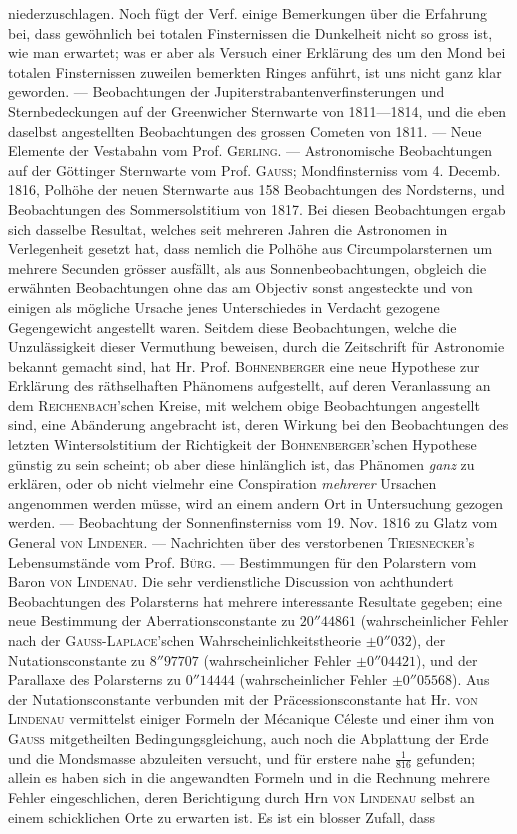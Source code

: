 niederzuschlagen. Noch fügt der Verf. einige Bemerkungen über die Erfahrung bei, dass gewöhnlich bei totalen Finsternissen die Dunkelheit nicht so gross ist, wie man erwartet; was er aber als Versuch einer Erklärung des um den Mond bei totalen Finsternissen zuweilen bemerkten Ringes anführt, ist uns nicht ganz klar geworden. --- Beobachtungen der Jupiterstrabantenverfinsterungen und Sternbedeckungen auf der Greenwicher Sternwarte von 1811---1814, und die eben daselbst angestellten Beobachtungen des grossen Cometen von 1811. --- Neue Elemente der Vestabahn vom Prof. \textsc{Gerling}. --- Astronomische Beobachtungen auf der Göttinger Sternwarte vom Prof. \textsc{Gauss}; Mondfinsterniss vom 4. Decemb. 1816, Polhöhe der neuen Sternwarte aus 158 Beobachtungen des Nordsterns, und Beobachtungen des Sommersolstitium von 1817. Bei diesen Beobachtungen ergab sich dasselbe Resultat, welches seit mehreren Jahren die Astronomen in Verlegenheit gesetzt hat, dass nemlich die Polhöhe aus Circumpolarsternen um mehrere Secunden grösser ausfällt, als aus Sonnenbeobachtungen, obgleich die erwähnten Beobachtungen ohne das am Objectiv sonst angesteckte und von einigen als mögliche Ursache jenes Unterschiedes in Verdacht gezogene Gegengewicht angestellt waren. Seitdem diese Beobachtungen, welche die Unzulässigkeit dieser Vermuthung beweisen, durch die Zeitschrift für Astronomie bekannt gemacht sind, hat Hr. Prof. \textsc{Bohnenberger} eine neue Hypothese zur Erklärung des räthselhaften Phänomens aufgestellt, auf deren Veranlassung an dem \textsc{Reichenbach}'schen Kreise, mit welchem obige Beobachtungen angestellt sind, eine Abänderung angebracht ist, deren Wirkung bei den Beobachtungen des letzten Wintersolstitium der Richtigkeit der \textsc{Bohnenberger}'schen Hypothese günstig zu sein scheint; ob aber diese hinlänglich ist, das Phänomen \emph{ganz} zu erklären, oder ob nicht vielmehr eine Conspiration \emph{mehrerer} Ursachen angenommen werden müsse, wird an einem andern Ort in Untersuchung gezogen werden. --- Beobachtung der Sonnenfinsterniss vom 19. Nov. 1816 zu Glatz vom General \textsc{von Lindener}. --- Nachrichten über des verstorbenen \textsc{Triesnecker}'s Lebensumstände vom Prof. \textsc{Bürg}. --- Bestimmungen für den Polarstern vom Baron \textsc{von Lindenau}. Die sehr verdienstliche Discussion von achthundert Beobachtungen des Polarsterns hat mehrere interessante Resultate gegeben; eine neue Bestimmung der Aberrationsconstante zu $20''44861$ (wahrscheinlicher Fehler nach der \textsc{Gauss-Laplace}'schen Wahrscheinlichkeitstheorie $\pm0''032$), der Nutationsconstante zu $8''97707$ (wahrscheinlicher Fehler $\pm0''04421$), und der Parallaxe des Polarsterns zu $0''14444$ (wahrscheinlicher Fehler $\pm0''05568$). Aus der Nutationsconstante verbunden mit der Präcessionsconstante hat Hr. \textsc{von Lindenau} vermittelst einiger Formeln der Mécanique Céleste und einer ihm von \textsc{Gauss} mitgetheilten Bedingungsgleichung, auch noch die Abplattung der Erde und die Mondsmasse abzuleiten versucht, und für erstere nahe $\tfrac{1}{816}$ gefunden; allein es haben sich in die angewandten Formeln und in die Rechnung mehrere Fehler eingeschlichen, deren Berichtigung durch Hrn \textsc{von Lindenau} selbst an einem schicklichen Orte zu erwarten ist. Es ist ein blosser Zufall, dass 